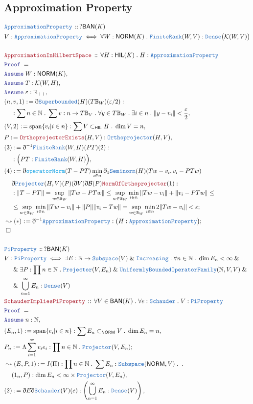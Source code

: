 \documentclass[12pt]{scrartcl}
\newcommand{\TYPE}[1]{\textcolor{NavyBlue}{\mathtt{#1}}}
\newcommand{\FUNC}[1]{\textcolor{Cerulean}{\mathtt{#1}}}
\newcommand{\LOGIC}[1]{\textcolor{Blue}{\mathtt{#1}}}
\newcommand{\THM}[1]{\textcolor{Maroon}{\mathtt{#1}}}
\renewcommand{\.}{\; . \;}
\newcommand{\de}{: \kern 0.1pc =}
\newcommand{\Theorem}[2]{& \THM{#1} \, :: \, #2 \\ & \Proof = \\ }
\newcommand{\DeclareType}[2]{& \TYPE{#1} \, :: \, #2 \\}
\newcommand{\DefineType}[3]{& #1 : \TYPE{#2} \iff #3 \\}
\newcommand{\NewLine}{\\ & \kern 1pc}
\newcommand{\Page}[1]{\begin{align*} #1 \end{align*} \newpage   }
\newcommand{ \bd }{ \ByDef }
\renewcommand{\And}{\; \& \;}
\newcommand{\Reals}{\mathbb{R} }
\newcommand{\Nat}{\mathbb{N} }
\newcommand{\Say}[3]{& #1 \de #2 : #3, \\}
\newcommand{\Conclude}[3]{& #1 \de #2 : #3; \\}
\newcommand{\Derive}[3]{& \leadsto #1 \de #2 : #3, \\}
\newcommand{\DeriveConclude}[3]{& \leadsto #1 \de #2 : #3 ; \\}
\newcommand{\A}{\LOGIC{Assume} \;}
\newcommand{\Assume}[2]{& \A #1 : #2, \\}
\newcommand{\QED}{\; \square}
\newcommand{\EndProof}{& \QED \\}
\newcommand{\ByDef}{\eth}
\newcommand{\Proof}{\LOGIC{Proof} \; }
\newcommand{\Ball}{ \mathbb{B} }
\DeclareMathOperator{\Span}{span}
\newcommand{\SB}{\TYPE{Superbounded}}
\newcommand{\NORM}{\mathsf{NORM}} %
\newcommand{\BAN}{\mathsf{BAN}} %
\newcommand{\HIL}{\mathsf{HIL}} %
\newcommand{\K}{\mathcal{K}} %
\newcommand{\B}{\mathcal{B}}
\begin{document}
\subsection{Approximation Property}
\Page{
 \DeclareType{ApproximationProperty}{ ?\BAN(K) } 
 \DefineType{V}{ApproximationProperty}{\forall W : \NORM(K) \. \TYPE{FiniteRank}(W,V) : \TYPE{Dense}\big( \K(W,V) \big)  }
 \\
 \Theorem{ApproximationInHilbertSpace}{\forall H : \HIL(K) \. H : \TYPE{ApproximationProperty}}
 \Assume{W}{ \NORM(K)}
 \Assume{T}{\K(W,H)}
 \Assume{\varepsilon}{\Reals_{++}}
 \Say{(n,v,1)}{\bd \SB(H)(T \Ball_W)(\varepsilon/2)     }{\NewLine :  \sum n \in \Nat \. \sum v : n \to  T \Ball_V \. 
 \forall y \in T \Ball_W \. \exists i \in n \. \|  y - v_i \| < \frac{\varepsilon}{2}}
 \Say{(V,2)}{\Span \{  v_i | i \in n \}}{\sum V \subset_{\HIL} H \. \dim V = n}
 \Say{P}{\THM{OrthoprojectorExists}(H,V)}{\TYPE{Orthoprojector}(H,V)}
 \Say{(3)}{\bd^{-1} \TYPE{FiniteRank}(W,H)(PT)(2)}{
	 \NewLine :
	 \Big( PT : \TYPE{FiniteRank}(W,H)   \Big)}
 \Conclude{(4)}{ \bd \FUNC{operatorNorm}(T - PT) \min_{i \in n} \bd_1 \TYPE{Seminorm}(H)(Tw - v_i, v_i - PTw) 
 \NewLine
 \bd \TYPE{Projector}(H,V)(P)(\bd V)
 \bd \B(P) \THM{NormOfOrthoprojector}(1)
 }{ 
 \NewLine :
 \| T - PT \| = \sup_{w \in \Ball_W}  \| Tw - PTw \| \le 
 \sup_{w \in \Ball_W } \min_{i \in n} \| Tw - v_i \| + \| v_i - PTw \| \le
 \NewLine \le
 \sup_{ w \in \Ball_W} \min_{i \in n} \| Tw - v_i \|  + \| P \| \| v_i - Tw \| =
 \sup_{w \in \Ball_W} \min_{i \in n}  2\| Tw - v_i \| < \varepsilon 
 }
 \DeriveConclude{(*)}{\bd^{-1} \TYPE{ApproximationProperty} }{\big( H : \TYPE{ApproximationProperty} \big)}
\EndProof
\\
\DeclareType{PiProperty}{?\BAN(K)}
\DefineType{V}{PiProperty}{\exists E : \Nat \to \TYPE{Subspace}(V) \And \TYPE{Increasing} : \forall n \in \Nat \. \dim E_n < \infty \And
\NewLine \And
\exists P : \prod n \in \Nat \. \TYPE{Projector}(V,E_n) \And \TYPE{UniformlyBoundedOperatorFamily}(\Nat,V,V)
\And \NewLine \And
\bigcup^\infty_{n = 1} E_n : \TYPE{Dense}(V)
}
\Theorem{SchauderImpliesPiProperty}{ \forall V \in \BAN(K) \. \forall e : \TYPE{Schauder} \. V : \TYPE{PiProperty}}
\Assume{n}{\Nat}
\Say{(E_n,1)}{\Span \{  e_i | i \in n  \}}{  \sum E_n \subset_\NORM V \. \dim E_n = n   }
\Conclude{ P_n}{ \Lambda \sum^\infty_{i = 1} v_i e_i }{\prod n \in \Nat \. \TYPE{Projector}(V,E_n)}
\Derive{(E,P,1)}{I(\Pi)}{ \prod n \in \Nat \. \sum E_n : \TYPE{Subspace}(\NORM,V) \. 
\. \NewLine(1_n,P) : \dim E_n < \infty \times \TYPE{Projector}(V,E_n)  }
\Say{(2)}{\bd E \bd \TYPE{Schauder}(V)(e)}{ \left( \bigcup^\infty_{n = 1} E_n : \TYPE{Dense}(V) \right)}
}
\end{document}
